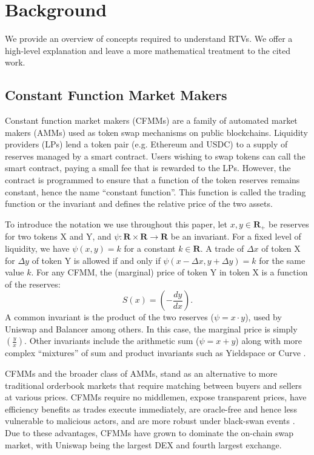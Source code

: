 \documentclass[hidelinks, 12pt]{article}
\begin{document}
\section{Background}

We provide an overview of concepts required to understand RTVs. We offer a high-level explanation and leave a more mathematical treatment to the cited work.

\subsection{Constant Function Market Makers}

Constant function market makers (CFMMs) are a family of automated market makers (AMMs) used as token swap mechanisms on public blockchains. Liquidity providers (LPs) lend a token pair (e.g. Ethereum and USDC) to a supply of reserves managed by a smart contract. Users wishing to swap tokens can call the smart contract, paying a small fee that is rewarded to the LPs. However, the contract is programmed to ensure that a function of the token reserves remains constant, hence the name ``constant function''. This function is called the trading function or the invariant and defines the relative price of the two assets.

To introduce the notation we use throughout this paper, let $x, y \in \mathbf{R}_+$ be reserves for two tokens X and Y, and $\psi: \mathbf{R} \times \mathbf{R} \rightarrow \mathbf{R}$ be an invariant. For a fixed level of liquidity, we have $\psi(x, y) = k$ for a constant $k \in \mathbf{R}$. A trade of $\Delta x$ of token X for $\Delta y$ of token Y is allowed if and only if $\psi(x - \Delta x, y + \Delta y) = k$ for the same value $k$. For any CFMM, the (marginal) price of token Y in token X is a function of the reserves:
\[S(x) = \left(-\frac{dy}{dx}\right).\]
A common invariant is the product of the two reserves ($\psi = x\cdot y$), used by Uniswap \cite{angeris2019analysis,adams2021uniswap} and Balancer \cite{martinelli2019non} among others.
In this case, the marginal price is simply $\left(\frac{y}{x}\right)$.
Other invariants include the arithmetic sum ($\psi = x + y$) along with more complex ``mixtures'' of sum and product invariants such as Yieldspace \cite{niemerg2020yieldspace} or Curve \cite{egorov2021automatic}.

CFMMs and the broader class of AMMs, stand as an alternative to more traditional orderbook markets that require matching between buyers and sellers at various prices. CFMMs require no middlemen, expose transparent prices, have efficiency benefits as trades execute immediately, are oracle-free and hence less vulnerable to malicious actors, and are more robust under black-swan events \cite{chitra2021liveness}. Due to these advantages, CFMMs have grown to dominate the on-chain swap market, with Uniswap being the largest DEX and fourth largest exchange.
\end{document}
